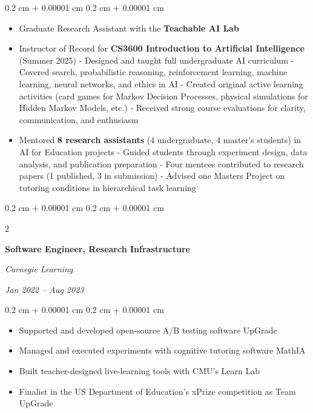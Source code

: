 \documentclass[10pt, letterpaper]{article}
\newenvironment{highlights}{
    \begin{itemize}[
        topsep=0.10 cm,
        parsep=0.10 cm,
        partopsep=0pt,
        itemsep=0pt,
        leftmargin=0.4 cm + 10pt
    ]
}{
    \end{itemize}
} %
\newenvironment{onecolentry}{
    \begin{adjustwidth}{
        0.2 cm + 0.00001 cm
    }{
        0.2 cm + 0.00001 cm
    }
}{
    \end{adjustwidth}
} %
\newenvironment{twocolentry}[2][]{
    \onecolentry
    \def\secondColumn{#2}
    \setcolumnwidth{\fill, 4.5 cm}
    \begin{paracol}{2}
}{
    \switchcolumn \raggedleft \secondColumn
    \end{paracol}
    \endonecolentry
} %
\begin{document}
        \vspace{0.10 cm}
        \begin{onecolentry}
            \begin{highlights}
                \item Graduate Research Assistant with the \textbf{Teachable AI Lab}
                \item Instructor of Record for \textbf{CS3600 Introduction to Artificial Intelligence} (Summer 2025) - Designed and taught full undergraduate AI curriculum - Covered search, probabilistic reasoning, reinforcement learning, machine learning, neural networks, and ethics in AI - Created original active learning activities (card games for Markov Decision Processes, physical simulations for Hidden Markov Models, etc.) - Received strong course evaluations for clarity, communication, and enthusiasm
                \item Mentored \textbf{8 research assistants} (4 undergraduate, 4 master’s students) in AI for Education projects - Guided students through experiment design, data analysis, and publication preparation - Four mentees contributed to research papers (1 published, 3 in submission) - Advised one Masters Project on tutoring conditions in hierarchical task learning
            \end{highlights}
        \end{onecolentry}


        \vspace{0.2 cm}

        \begin{twocolentry}{
            
            
        \textit{Jan 2022 – Aug 2023}}
            \textbf{Software Engineer, Research Infrastructure}
            
            \textit{Carnegie Learning}
        \end{twocolentry}

        \vspace{0.10 cm}
        \begin{onecolentry}
            \begin{highlights}
                \item Supported and developed open-source A/B testing software UpGrade
                \item Managed and executed experiments with cognitive tutoring software MathIA
                \item Built teacher-designed live-learning tools with CMU's Learn Lab
                \item Finalist in the US Department of Education's xPrize competition as Team UpGrade
            \end{highlights}
        \end{onecolentry}
\end{document}
